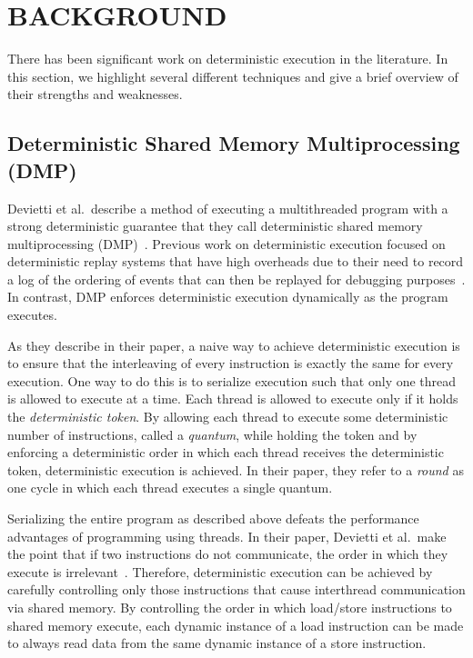 \chapter{BACKGROUND}
\label{BACKGROUND}

There has been significant work on deterministic execution in the
literature.  In this section, we highlight several different
techniques and give a brief overview of their strengths and
weaknesses.

\section{Deterministic Shared Memory Multiprocessing (DMP)}

Devietti et al.\ describe a method of executing a multithreaded
program with a strong deterministic guarantee that they call
deterministic shared memory multiprocessing (DMP)~\cite{dmp}.
Previous work on deterministic execution focused on deterministic
replay systems that have high overheads due to their need to record a
log of the ordering of events that can then be replayed for debugging
purposes~\cite{recplay}.  In contrast, DMP enforces deterministic
execution dynamically as the program executes.

As they describe in their paper, a naive way to achieve deterministic
execution is to ensure that the interleaving of every instruction is
exactly the same for every execution.  One way to do this is to
serialize execution such that only one thread is allowed to execute at
a time.  Each thread is allowed to execute only if it holds the
\emph{deterministic token}.  By allowing each thread to execute some
deterministic number of instructions, called a \emph{quantum}, while
holding the token and by enforcing a deterministic order in which each
thread receives the deterministic token, deterministic execution is
achieved.  In their paper, they refer to a \emph{round} as one cycle
in which each thread executes a single quantum.

Serializing the entire program as described above defeats the
performance advantages of programming using threads.  In their paper,
Devietti et al.\ make the point that if two instructions do not
communicate, the order in which they execute is irrelevant~\cite{dmp}.
Therefore, deterministic execution can be achieved by carefully
controlling only those instructions that cause interthread
communication via shared memory.  By controlling the order in which
load/store instructions to shared memory execute, each dynamic
instance of a load instruction can be made to always read data from
the same dynamic instance of a store instruction.


